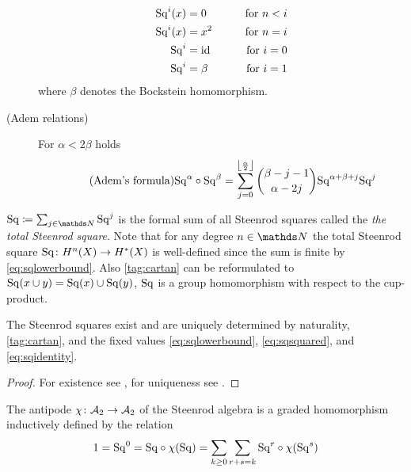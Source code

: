 \begin{Def}
\begin{description}
    \begin{alignat}{4}
      \Sq i(x) &= 0     & \qquad\text{for }n<i \label{eq:sqlowerbound}\\
      \Sq i(x) &= x^2   & \qquad\text{for }n=i \label{eq:sqsquared}\\
      \Sq i    &= \Id   & \qquad\text{for }i=0 \label{eq:sqidentity}\\\notag
      \Sq i    &= \beta & \qquad\text{for }i=1 %
    \end{alignat}
    where $\beta$ denotes the Bockstein homomorphism. %
  \item[(Adem relations)] For $\alpha<2\beta$ holds
    \begin{gather}\label{tag:adem}\tag{Adem's formula}
      \mathrm{Sq}^{\alpha} \circ \mathrm{Sq}^{\beta} =
      \sum_{j=0}^{\left\lfloor \frac \alpha 2 \right\rfloor}
      \binom{\beta-j-1}{\alpha-2j}
      \mathrm{Sq}^{\alpha+\beta+j}\mathrm{Sq}^{j}
    \end{gather}
  \end{description}
  $\SQ\coloneqq \sum_{j\in\Nat}\Sq j$ is the formal sum of all
  Steenrod squares called the \emph{the total Steenrod square}.
  Note that for any degree $n\in\Nat$ the total Steenrod square
  $\mathrm{Sq}\colon H^n(X)\to H^*(X)$ is well-defined since the sum is
  finite by \eqref{eq:sqlowerbound}.
  Also \ref{tag:cartan} can be reformulated to
  $\mathrm{Sq}(x\cup y) = \mathrm{Sq}(x)\cup\mathrm{Sq}(y)$, \idest $\mathrm{Sq}$ is a group
  homomorphism with respect to the cup-product.
\end{Def}

\begin{Thm}
  The Steenrod squares exist and are uniquely determined by
  naturality,\ref{tag:cartan}, and the fixed values
  \eqref{eq:sqlowerbound}, \eqref{eq:sqsquared}, and \eqref{eq:sqidentity}.
  \begin{proof}
    For existence see \cite[Chapter 2]{mosher},
    for uniqueness see \cite[VIII §3]{steenrodepstein}.
  \end{proof}
\end{Thm}

\begin{Def}%
\end{Def}

\begin{Def}\label{def:antipode}
  The antipode $\chi\colon \mathcal{A}_2\to\mathcal{A}_2$ of the Steenrod algebra is a
  graded homomorphism inductively defined by the relation
  \begin{gather*}
    1 = \mathrm{Sq}^{0}
    = \mathrm{Sq} \circ \chi(\mathrm{Sq})
    = \sum_{k\geq0}\sum_{r+s=k} \mathrm{Sq}^{r} \circ \chi(\mathrm{Sq}^{s})
  \end{gather*}
\end{Def}

